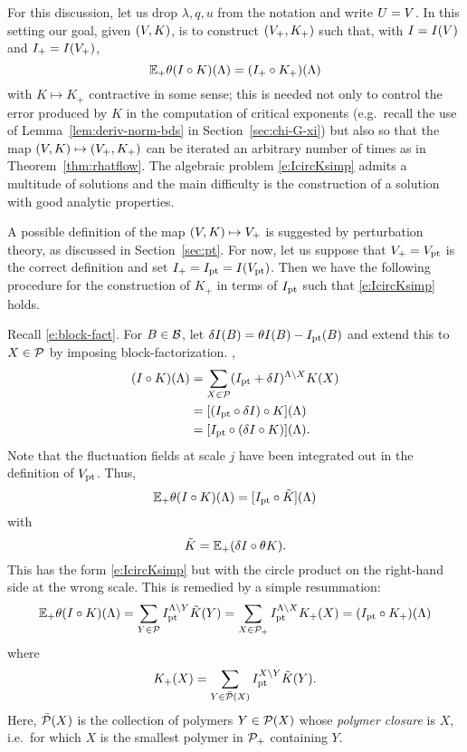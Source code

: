 For this discussion, let us drop $\lambda, q, u$ from the notation and write
$U = V$. In this setting our goal, given $(V, K)$, is to construct
$(V_+, K_+)$ such that, with $I = I(V)$ and $I_+ = I(V_+)$,
\begin{equation}
\label{e:IcircKsimp}
\mathbb{E}_+ \theta (I \circ K)(\Lambda) = (I_+ \circ K_+)(\Lambda)
\end{equation}
with $K \mapsto K_+$ contractive in some sense; this is needed not only to
control the error produced by $K$ in the computation of critical exponents
(e.g.\ recall the use of Lemma~\ref{lem:deriv-norm-bds} in Section~\ref{sec:chi-G-xi})
but also so that the map
$(V, K) \mapsto (V_+, K_+)$ can be iterated an arbitrary number of times as in
Theorem~\ref{thm:rhatflow}. The algebraic problem \eqref{e:IcircKsimp} admits
a multitude of solutions and the main difficulty is the construction of a
solution with good analytic properties.

A possible definition of the map $(V, K) \mapsto V_+$ is suggested by perturbation
theory, as discussed in Section~\ref{sec:pt}. For now, let us suppose that $V_+ = V_{\rm pt}$
is the correct definition and set $I_+ = I_{\rm pt} = I(V_{\rm pt})$. Then we have the following procedure
for the construction of $K_+$ in terms of $I_{\rm pt}$ such that \eqref{e:IcircKsimp} holds.

Recall \eqref{e:block-fact}.
For $B\in\mathcal{B}$, let $\delta I(B) = \theta I(B) - I_{\rm pt}(B)$ and extend this to $X\in\mathcal{P}$
by imposing block-factorization.
,
\begin{align}
(I \circ K)(\Lambda)
	&= \sum_{X\in\mathcal{P}} (I_{\rm pt} + \delta I)^{\Lambda \setminus X} K(X) \nonumber \\
	&= [(I_{\rm pt} \circ \delta I) \circ K](\Lambda) \nonumber \\
	&= [I_{\rm pt} \circ (\delta I \circ K)](\Lambda).
\end{align}
Note that the fluctuation fields at scale $j$ have been integrated out in the
definition of $V_{\rm pt}$. Thus,
\begin{equation}
\mathbb{E}_+ \theta(I \circ K)(\Lambda) = [I_{\rm pt} \circ \tilde K](\Lambda)
\end{equation}
with
\begin{equation}
\tilde K = \mathbb{E}_+ (\delta I \circ \theta K).
\end{equation}
This has the form \eqref{e:IcircKsimp} but with the circle product on the right-hand
side at the wrong scale. This is remedied by a simple resummation:
\begin{equation}
\mathbb{E}_+ \theta (I \circ K)(\Lambda)
	= \sum_{Y\in\mathcal{P}} I_{\rm pt}^{\Lambda \setminus Y} \tilde K(Y)
	= \sum_{X\in\mathcal{P}_+} I_{\rm pt}^{\Lambda \setminus X} K_+(X)
	= (I_{\rm pt} \circ K_+)(\Lambda)
\end{equation}
where
\begin{equation}
\label{e:Kplus3}
K_+(X) = \sum_{Y \in \bar{\mathcal{P}}(X)} I_{\rm pt}^{X \setminus Y} \tilde K(Y).
\end{equation}
Here, $\bar{\mathcal{P}}(X)$ is the collection of polymers $Y\in\mathcal{P}(X)$ whose
\emph{polymer closure} is $X$, i.e.\ for which
$X$ is the smallest polymer in $\mathcal{P}_+$ containing $Y$.


